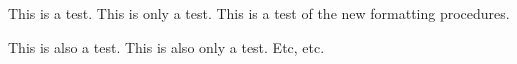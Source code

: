 This is a test. This is only a test. This is a test of the new formatting procedures.

This is also a test. This is also only a test. Etc, etc.
